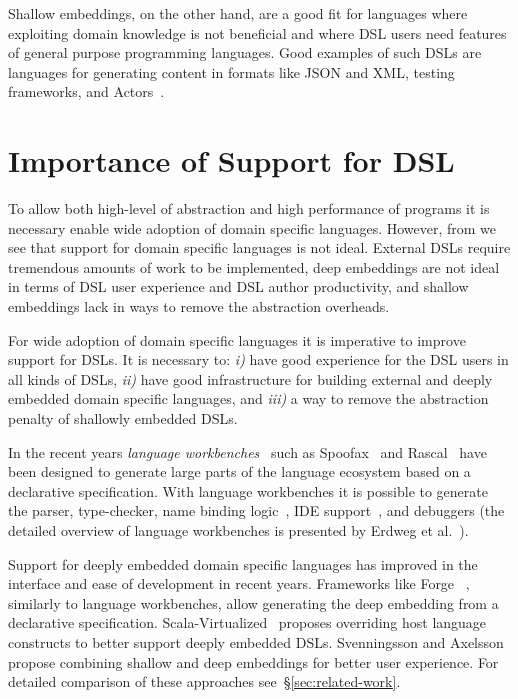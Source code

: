 Shallow embeddings, on the other hand, are a good fit for languages where exploiting domain knowledge is not beneficial and where DSL users need features of general purpose programming
 languages. Good examples of such DSLs are languages for generating content in formats like JSON
 and XML, testing frameworks, and Actors~\cite{haller2009scala}.


\section{Importance of Support for DSL}
\label{sec:importance-of-language-support}

To allow both high-level of abstraction and high performance of programs it is necessary
 enable wide adoption of domain specific languages. However, from  we
 see that support for domain specific languages is not ideal. External DSLs require
 tremendous amounts of work to be implemented, deep embeddings are not ideal in terms
 of DSL user experience and DSL author productivity, and shallow embeddings lack in
 ways to remove the abstraction overheads.

 For wide adoption of domain specific languages it is imperative to improve support
 for DSLs. It is necessary to: \emph{i)} have good experience for the DSL users in all kinds of DSLs,
  \emph{ii)} have good infrastructure for building external and deeply embedded domain specific languages, and \emph{iii)} a way to remove the abstraction penalty of shallowly embedded DSLs.

In the recent years \emph{language workbenches}~\cite{fowler2005language} such as
 Spoofax~\cite{kats2010spoofax} and Rascal~\cite{klint2009rascal,van2011rascal} have been designed
  to generate large parts of the language ecosystem based on a declarative specification.
  With language workbenches it is possible to generate the parser, type-checker, name binding logic~,
  IDE support~, and debuggers (the detailed overview of language workbenches is presented by Erdweg et al.~\cite{erdweg2013state}).

Support for deeply embedded domain specific languages has improved in the interface and
ease of development in recent years. Frameworks like Forge~\cite{forge}
, similarly to language workbenches, allow generating the deep embedding from a declarative
specification. Scala-Virtualized~\cite{rompf_scala-virtualized:_2009} proposes overriding
 host language constructs to better support deeply embedded DSLs. Svenningsson and Axelsson~\cite{svenningsson_combining_2012}
 propose combining shallow and deep embeddings for better user experience. For detailed
 comparison of these approaches see~\S \ref{sec:related-work}.

